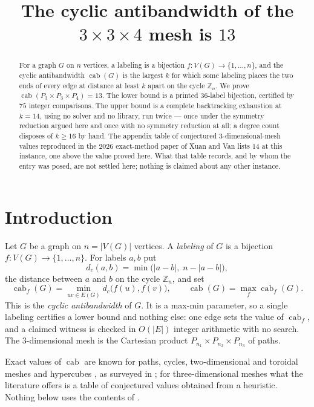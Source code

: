 \documentclass[11pt]{amsart}
\title[The cyclic antibandwidth of the $3\times3\times4$ mesh]
{The cyclic antibandwidth of the $3\times3\times4$ mesh is $13$}
\date{}
\theoremstyle{remark}
\DeclareMathOperator{\cab}{cab}
\begin{document}
\begin{abstract}
For a graph $G$ on $n$ vertices, a labeling is a bijection $f\colon V(G)\to\{1,\dots,n\}$, and
the cyclic antibandwidth $\cab(G)$ is the largest $k$ for which some labeling places the two ends
of every edge at distance at least $k$ apart on the cycle $\mathbb Z_n$.
We prove $\cab(P_3\times P_3\times P_4)=13$. The lower bound is a printed $36$-label bijection,
certified by $75$ integer comparisons. The upper bound is a complete backtracking exhaustion at
$k=14$, using no solver and no library, run twice --- once under the symmetry reduction argued
here and once with no symmetry reduction at all; a degree count disposes of $k\ge16$ by hand.
The appendix table of conjectured $3$-dimensional-mesh values reproduced in the $2026$
exact-method paper of Xuan and Van lists $14$ at this instance, one above the value proved here.
What that table records, and by whom the entry was posed, are not settled here; nothing is
claimed about any other instance.
\end{abstract}

\maketitle

\section{Introduction}\label{sec:intro}

Let $G$ be a graph on $n=|V(G)|$ vertices. A \emph{labeling} of $G$ is a bijection
$f\colon V(G)\to\{1,\dots,n\}$. For labels $a,b$ put
\[
 d_c(a,b)=\min\bigl(|a-b|,\;n-|a-b|\bigr),
\]
the distance between $a$ and $b$ on the cycle $\mathbb Z_n$, and set
\[
 \cab_f(G)=\min_{uv\in E(G)}d_c\bigl(f(u),f(v)\bigr),
 \qquad
 \cab(G)=\max_f \cab_f(G).
\]
This is the \emph{cyclic antibandwidth} of $G$. It is a max-min parameter, so a single labeling
certifies a lower bound and nothing else: one edge sets the value of $\cab_f$, and a claimed
witness is checked in $O(|E|)$ integer arithmetic with no search. The $3$-dimensional mesh is the
Cartesian product $P_{n_1}\times P_{n_2}\times P_{n_3}$ of paths.

Exact values of $\cab$ are known for paths, cycles, two-dimensional and toroidal meshes and
hypercubes \cite{STV,RSSTV}, as surveyed in \cite{XT}; for three-dimensional meshes what the
literature offers is a table of conjectured values obtained from a heuristic. Nothing below uses
the contents of \cite{STV,RSSTV,TV}.
\end{document}
